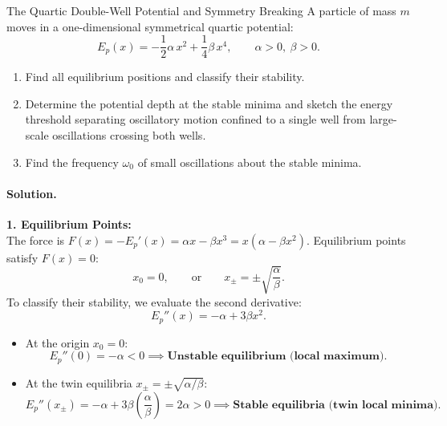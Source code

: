 \begin{workedexample}{The Quartic Double-Well Potential and Symmetry Breaking}
A particle of mass $m$ moves in a one-dimensional symmetrical quartic potential:
\begin{equation}
E_p(x) = -\frac{1}{2}\alpha\, x^2 + \frac{1}{4}\beta\, x^4, \qquad \alpha > 0,\ \beta > 0.
\end{equation}
\begin{enumerate}[leftmargin=1.4em,itemsep=3pt]
  \item Find all equilibrium positions and classify their stability.
  \item Determine the potential depth at the stable minima and sketch the energy threshold separating oscillatory motion confined to a single well from large-scale oscillations crossing both wells.
  \item Find the frequency $\omega_0$ of small oscillations about the stable minima.
\end{enumerate}

\paragraph{Solution.}
\textbf{1. Equilibrium Points:}\\
The force is $F(x) = -E_p'(x) = \alpha x - \beta x^3 = x(\alpha - \beta x^2)$.
Equilibrium points satisfy $F(x) = 0$:
\[
x_0 = 0, \qquad \text{or} \qquad x_{\pm} = \pm \sqrt{\frac{\alpha}{\beta}}.
\]
To classify their stability, we evaluate the second derivative:
\[
E_p''(x) = -\alpha + 3\beta x^2.
\]
\begin{itemize}[leftmargin=1.5em,itemsep=2pt]
  \item At the origin $x_0 = 0$:
  \[
  E_p''(0) = -\alpha < 0 \implies \textbf{Unstable equilibrium (local maximum)}.
  \]
  \item At the twin equilibria $x_{\pm} = \pm\sqrt{\alpha/\beta}$:
  \[
  E_p''(x_{\pm}) = -\alpha + 3\beta\left(\frac{\alpha}{\beta}\right) = 2\alpha > 0 \implies \textbf{Stable equilibria (twin local minima)}.
  \]
\end{itemize}


\end{workedexample}
